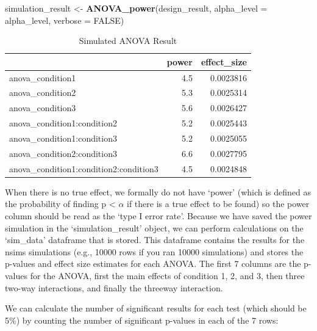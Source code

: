 \documentclass[
]{book}
\newenvironment{Shaded}{\begin{snugshade}}{\end{snugshade}}
\newcommand{\DataTypeTok}[1]{\textcolor[rgb]{0.13,0.29,0.53}{#1}}
\newcommand{\KeywordTok}[1]{\textcolor[rgb]{0.13,0.29,0.53}{\textbf{#1}}}
\newcommand{\NormalTok}[1]{#1}
\newcommand{\OtherTok}[1]{\textcolor[rgb]{0.56,0.35,0.01}{#1}}
\newcommand{\StringTok}[1]{\textcolor[rgb]{0.31,0.60,0.02}{#1}}
\begin{document}
\begin{Shaded}
\begin{Highlighting}[]
\NormalTok{simulation_result <-}\StringTok{ }\KeywordTok{ANOVA_power}\NormalTok{(design_result,}
                                 \DataTypeTok{alpha_level =}\NormalTok{ alpha_level,}
                                 \DataTypeTok{verbose =} \OtherTok{FALSE}\NormalTok{)}
\end{Highlighting}
\end{Shaded}

\begin{table}[!h]

\caption{\label{tab:unnamed-chunk-254}Simulated ANOVA Result}
\centering
\begin{tabular}[t]{l|r|r}
\hline
  & power & effect\_size\\
\hline
anova\_condition1 & 4.5 & 0.0023816\\
\hline
anova\_condition2 & 5.3 & 0.0025314\\
\hline
anova\_condition3 & 5.6 & 0.0026427\\
\hline
anova\_condition1:condition2 & 5.2 & 0.0025443\\
\hline
anova\_condition1:condition3 & 5.2 & 0.0025055\\
\hline
anova\_condition2:condition3 & 6.6 & 0.0027795\\
\hline
anova\_condition1:condition2:condition3 & 4.5 & 0.0024848\\
\hline
\end{tabular}
\end{table}

When there is no true effect, we formally do not have `power' (which is defined as the probability of finding p \textless{} \(\alpha\) if there is a true effect to be found) so the power column should be read as the `type I error rate'. Because we have saved the power simulation in the `simulation\_result' object, we can perform calculations on the `sim\_data' dataframe that is stored. This dataframe contains the results for the nsims simulations (e.g., 10000 rows if you ran 10000 simulations) and stores the p-values and effect size estimates for each ANOVA. The first 7 columns are the p-values for the ANOVA, first the main effects of condition 1, 2, and 3, then three two-way interactions, and finally the threeway interaction.

We can calculate the number of significant results for each test (which should be 5\%) by counting the number of significant p-values in each of the 7 rows:
\end{document}
